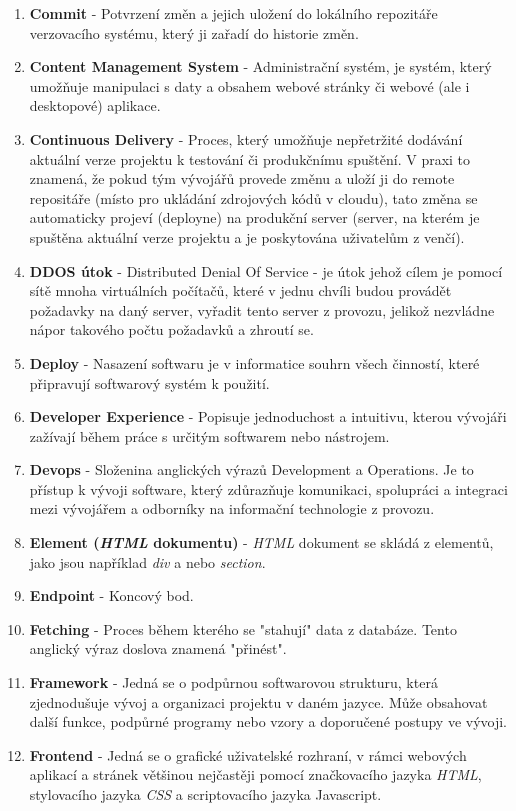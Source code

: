 \documentclass[12pt,a4paper]{report}
\begin{document}
\begin{enumerate}
    \item \textbf{Commit} - Potvrzení změn a jejich uložení do lokálního repozitáře verzovacího systému, který ji zařadí do historie změn.
    \item \textbf{Content Management System} - Administrační systém, je systém, který umožňuje manipulaci s daty a obsahem webové stránky či webové (ale i desktopové) aplikace.
    \item \textbf{Continuous Delivery} -  Proces, který umožňuje nepřetržité dodávání aktuální verze projektu k testování či produkčnímu spuštění. V praxi to znamená, že pokud tým vývojářů provede změnu a uloží ji do remote repositáře (místo pro ukládání zdrojových kódů v cloudu), tato změna se automaticky projeví (deployne) na produkční server (server, na kterém je spuštěna aktuální verze projektu a je poskytována uživatelům z venčí).
    \item \textbf{DDOS útok} - Distributed Denial Of Service - je útok jehož cílem je pomocí sítě mnoha virtuálních počítačů, které v jednu chvíli budou provádět požadavky na daný server, vyřadit tento server z provozu, jelikož nezvládne nápor takového počtu požadavků a zhroutí se.
    \item \textbf{Deploy} - Nasazení softwaru je v informatice souhrn všech činností, které připravují softwarový systém k použití.
    \item \textbf{Developer Experience} - Popisuje jednoduchost a intuitivu, kterou vývojáři zažívají během práce s určitým softwarem nebo nástrojem.
    \item \textbf{Devops} - Složenina anglických výrazů Development a Operations. Je to přístup k vývoji software, který zdůrazňuje komunikaci, spolupráci a integraci mezi vývojářem a odborníky na informační technologie z provozu. 
    \item \textbf{Element (\emph{HTML} dokumentu)} - \emph{HTML} dokument se skládá z elementů, jako jsou například \emph{div} a nebo \emph{section}.
    \item \textbf{Endpoint} - Koncový bod. 
    \item \textbf{Fetching} - Proces během kterého se "stahují" data z databáze. Tento anglický výraz doslova znamená "přinést".
    \item \textbf{Framework} - Jedná se o podpůrnou softwarovou strukturu, která zjednodušuje vývoj a organizaci projektu v daném jazyce. Může obsahovat další funkce, podpůrné programy nebo vzory a doporučené postupy ve vývoji.
    \item \textbf{Frontend} - Jedná se o grafické uživatelské rozhraní, v rámci webových aplikací a stránek většinou nejčastěji pomocí značkovacího jazyka \emph{HTML}, stylovacího jazyka \emph{CSS} a scriptovacího jazyka Javascript.

\end{enumerate}
\end{document}
